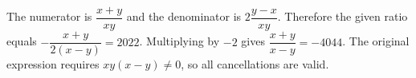 The numerator is $\dfrac{x+y}{xy}$ and the denominator is $2\dfrac{y-x}{xy}$. Therefore the given ratio equals $-\dfrac{x+y}{2(x-y)}=2022$. Multiplying by $-2$ gives $\boxed{\dfrac{x+y}{x-y}=-4044}$. The original expression requires $xy(x-y)\ne 0$, so all cancellations are valid.
